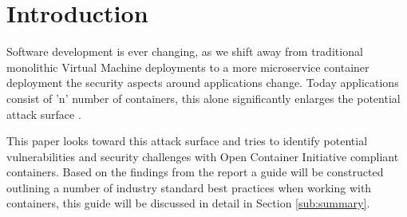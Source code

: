 \section{Introduction}
\label{sub:introduction}
Software development is ever changing, as we shift away from traditional monolithic Virtual Machine deployments to a more microservice container deployment the security aspects around applications change. Today applications consist of 'n' number of containers, this alone significantly enlarges the potential attack surface \citep{bryk_2018}.

This paper looks toward this attack surface and tries to identify potential vulnerabilities and security challenges with Open Container Initiative compliant containers. Based on the findings from the report a guide will be constructed outlining a number of industry standard best practices when working with containers, this guide will be discussed in detail in Section \ref{sub:summary}.